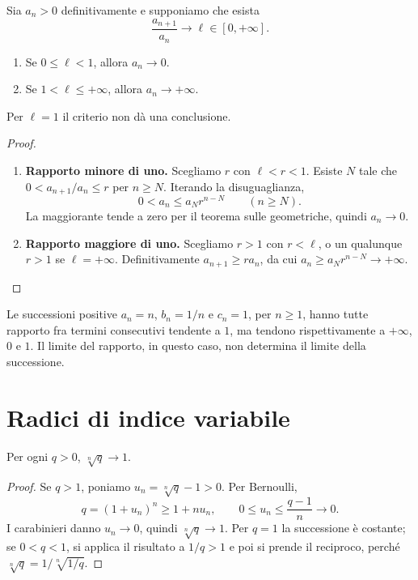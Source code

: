 \begin{proposizione}
\label{prop:criterio-rapporto}
Sia $a_n>0$ definitivamente e supponiamo che esista
\[
\frac{a_{n+1}}{a_n}\longrightarrow\ell\in[0,+\infty].
\]
\begin{enumerate}[label=\arabic*.]
\item Se $0\le\ell<1$, allora $a_n\to0$.
\item Se $1<\ell\le+\infty$, allora $a_n\to+\infty$.
\end{enumerate}
Per $\ell=1$ il criterio non dà una conclusione.
\end{proposizione}
\begin{proof}
\begin{enumerate}[label=\arabic*.]
\item \textbf{Rapporto minore di uno.} Scegliamo $r$ con $\ell<r<1$. Esiste $N$ tale che $0<a_{n+1}/a_n\le r$ per $n\ge N$. Iterando la disuguaglianza,
\[
0<a_n\le a_Nr^{n-N}\qquad(n\ge N).
\]
La maggiorante tende a zero per il teorema sulle geometriche, quindi $a_n\to0$.
\item \textbf{Rapporto maggiore di uno.} Scegliamo $r>1$ con $r<\ell$, o un qualunque $r>1$ se $\ell=+\infty$. Definitivamente $a_{n+1}\ge r a_n$, da cui $a_n\ge a_Nr^{n-N}\to+\infty$.
\end{enumerate}
\end{proof}

\begin{esempio}
Le successioni positive $a_n=n$, $b_n=1/n$ e $c_n=1$, per $n\ge1$, hanno tutte rapporto fra termini consecutivi tendente a $1$, ma tendono rispettivamente a $+\infty$, $0$ e $1$. Il limite del rapporto, in questo caso, non determina il limite della successione.
\end{esempio}

\section{Radici di indice variabile}

\begin{proposizione}
\label{prop:radice-costante}
Per ogni $q>0$, $\sqrt[n]{q}\to1$.
\end{proposizione}
\begin{proof}
Se $q>1$, poniamo $u_n=\sqrt[n]{q}-1>0$. Per Bernoulli,
\[
q=(1+u_n)^n\ge1+nu_n,
\qquad 0\le u_n\le\frac{q-1}{n}\longrightarrow0.
\]
I carabinieri danno $u_n\to0$, quindi $\sqrt[n]{q}\to1$. Per $q=1$ la successione è costante; se $0<q<1$, si applica il risultato a $1/q>1$ e poi si prende il reciproco, perché $\sqrt[n]{q}=1/\sqrt[n]{1/q}$.
\end{proof}

